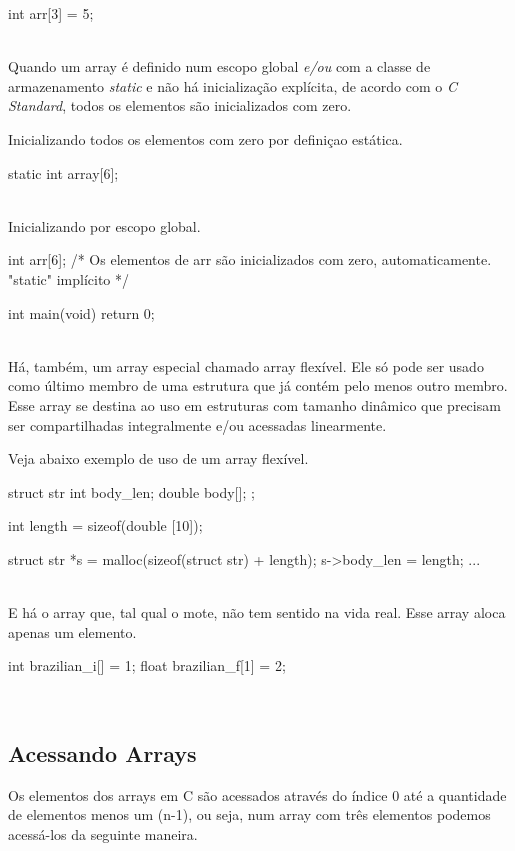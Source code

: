 \begin{ccode}
  int arr[3] = {5};
\end{ccode}
\\

Quando um array é definido num escopo global \textit{e/ou} com a classe de armazenamento \textit{static} e não há inicialização explícita, de acordo com o \textit{C Standard}, todos os elementos são inicializados com zero.

Inicializando todos os elementos com zero por definiçao estática.

\begin{ccode}
  static int array[6];
\end{ccode}
\\

Inicializando por escopo global.

\begin{ccode}
int arr[6];    /* Os elementos de arr são inicializados
                  com zero, automaticamente.
                  "static" implícito */

int main(void)
{
  return 0;
}
\end{ccode}
\\

Há, também, um array especial chamado array flexível. Ele só pode ser usado como último membro de uma estrutura que já contém pelo menos outro membro. Esse array se destina ao uso em estruturas com tamanho dinâmico que precisam ser compartilhadas integralmente e/ou acessadas linearmente.

Veja abaixo exemplo de uso de um array flexível.

\begin{ccode}
  struct str {
      int body_len;
      double body[];
  };

  int length = sizeof(double [10]);

  struct str *s = malloc(sizeof(struct str) + length);
  s->body_len = length;
  ...
\end{ccode}
\\

E há o array  que, tal qual o mote, não tem sentido na vida real. Esse array aloca apenas um elemento.

\begin{ccode}
  int brazilian_i[] = {1};
  float brazilian_f[1] = {2};
\end{ccode}
\\

\subsection{Acessando Arrays}
Os elementos dos arrays em C são acessados através do índice 0 até a quantidade de elementos menos um (n-1), ou seja, num array com três elementos podemos acessá-los da seguinte maneira.

